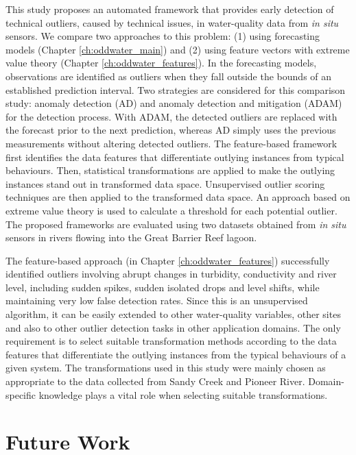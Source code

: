 \documentclass{monashthesis}
\theoremstyle{definition}
\theoremstyle{definition}
\theoremstyle{definition}
\theoremstyle{remark}
\begin{document}
This study proposes an automated framework that provides early detection of technical outliers, caused by technical issues, in water-quality data from \emph{in situ} sensors. We compare two approaches to this problem: (1) using forecasting models (Chapter \ref{ch:oddwater_main}) and (2) using feature vectors with extreme value theory (Chapter \ref{ch:oddwater_features}). In the forecasting models, observations are identified as outliers when they fall outside the bounds of an established prediction interval. Two strategies are considered for this comparison study: anomaly detection (AD) and anomaly detection and mitigation (ADAM) for the detection process. With ADAM, the detected outliers are replaced with the forecast prior to the next prediction, whereas AD simply uses the previous measurements without altering detected outliers. The feature-based framework first identifies the data features that differentiate outlying instances from typical behaviours. Then, statistical transformations are applied to make the outlying instances stand out in transformed data space. Unsupervised outlier scoring techniques are then applied to the transformed data space. An approach based on extreme value theory is used to calculate a threshold for each potential outlier. The proposed frameworks are evaluated using two datasets obtained from \emph{in situ} sensors in rivers flowing into the Great Barrier Reef lagoon.

The feature-based approach (in Chapter \ref{ch:oddwater_features}) successfully identified outliers involving abrupt changes in turbidity, conductivity and river level, including sudden spikes, sudden isolated drops and level shifts, while maintaining very low false detection rates. Since this is an unsupervised algorithm, it can be easily extended to other water-quality variables, other sites and also to other outlier detection tasks in other application domains. The only requirement is to select suitable transformation methods according to the data features that differentiate the outlying instances from the typical behaviours of a given system. The transformations used in this study were mainly chosen as appropriate to the data collected from Sandy Creek and Pioneer River. Domain-specific knowledge plays a vital role when selecting suitable transformations.

\hypertarget{future-work}{%
\section{Future Work}\label{future-work}}
\end{document}
